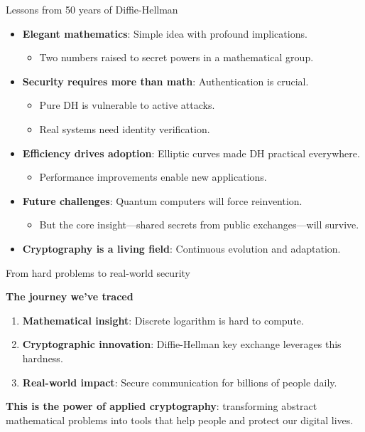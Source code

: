 \documentclass[aspectratio=169, lualatex, handout]{beamer}
\begin{document}
\begin{frame}{Lessons from 50 years of Diffie-Hellman}
	\begin{itemize}[<+->]
		\item \textbf{Elegant mathematics}: Simple idea with profound implications.
		      \begin{itemize}
			      \item Two numbers raised to secret powers in a mathematical group.
		      \end{itemize}
		\item \textbf{Security requires more than math}: Authentication is crucial.
		      \begin{itemize}
			      \item Pure DH is vulnerable to active attacks.
			      \item Real systems need identity verification.
		      \end{itemize}
		\item \textbf{Efficiency drives adoption}: Elliptic curves made DH practical everywhere.
		      \begin{itemize}
			      \item Performance improvements enable new applications.
		      \end{itemize}
		\item \textbf{Future challenges}: Quantum computers will force reinvention.
		      \begin{itemize}
			      \item But the core insight—shared secrets from public exchanges—will survive.
		      \end{itemize}
		\item \textbf{Cryptography is a living field}: Continuous evolution and adaptation.
	\end{itemize}
\end{frame}

\begin{frame}{From hard problems to real-world security}
	\begin{center}
		\Large\textbf{The journey we've traced}
	\end{center}
	\vspace{0.5cm}
	\begin{enumerate}[<+->]
		\item \textbf{Mathematical insight}: Discrete logarithm is hard to compute.
		\item \textbf{Cryptographic innovation}: Diffie-Hellman key exchange leverages this hardness.
		\item \textbf{Real-world impact}: Secure communication for billions of people daily.
	\end{enumerate}
	\vspace{1cm}
	\textbf{This is the power of applied cryptography}: transforming abstract mathematical problems into tools that help people and protect our digital lives.
\end{frame}
\end{document}
